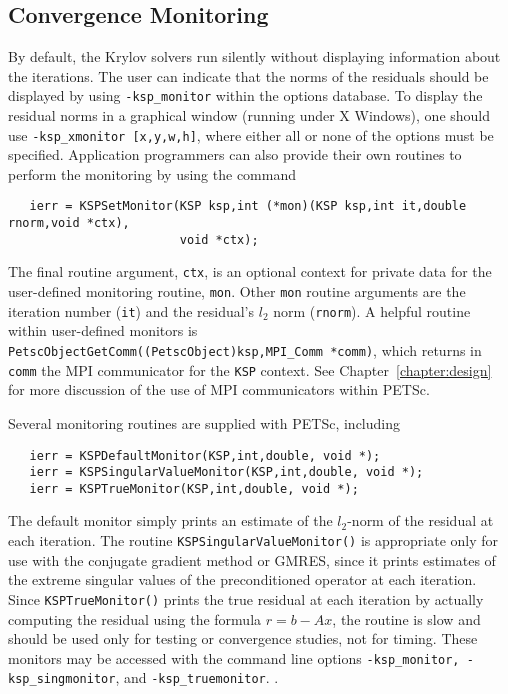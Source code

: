 \subsection{Convergence Monitoring}
\label{sec:kspmonitor}

By default, the Krylov solvers run silently without displaying information 
about the iterations. The user can indicate that the norms of the residuals 
should be displayed by using 
{\tt -ksp\_monitor} within the options database.  
To display the residual norms in a graphical window (running under X Windows),
one should use {\tt -ksp\_xmonitor [x,y,w,h]}, where either all or none of 
the options must be specified. 
Application programmers can also provide their own routines to perform 
the monitoring by using the command 
\begin{verbatim}
   ierr = KSPSetMonitor(KSP ksp,int (*mon)(KSP ksp,int it,double rnorm,void *ctx),
                        void *ctx);
\end{verbatim}
The final routine argument, {\tt ctx}, is an optional context for private
data for the user-defined monitoring routine, {\tt mon}.  Other
{\tt mon} routine arguments are the iteration
number ({\tt it}) and the residual's $l_2$ norm ({\tt rnorm}).
A helpful routine within user-defined monitors is 
{\tt PetscObjectGetComm((PetscObject)ksp,MPI\_Comm *comm)}, which returns
in {\tt comm}   the
MPI communicator for the {\tt KSP} context.  See Chapter~\ref{chapter:design}
for more discussion of the use of MPI communicators within PETSc.

Several monitoring routines are supplied with PETSc, 
including  
\begin{verbatim}
   ierr = KSPDefaultMonitor(KSP,int,double, void *);
   ierr = KSPSingularValueMonitor(KSP,int,double, void *);
   ierr = KSPTrueMonitor(KSP,int,double, void *);
\end{verbatim}
The default monitor simply prints an estimate of the $l_2$-norm of the 
residual at each iteration. The routine
{\tt KSPSingularValueMonitor()} is appropriate only for use with the conjugate 
gradient method or GMRES, since it prints estimates of the extreme singular 
values of the preconditioned operator at each iteration. Since
{\tt KSPTrueMonitor()} prints 
the true residual at each iteration by 
actually computing the residual using the formula $ r = b - Ax$, the routine
is slow and should be used only for testing or convergence studies,
not for timing. These monitors may be accessed with the command line options
{\tt -ksp\_monitor, -ksp\_singmonitor}, and {\tt -ksp\_truemonitor}.
  .

